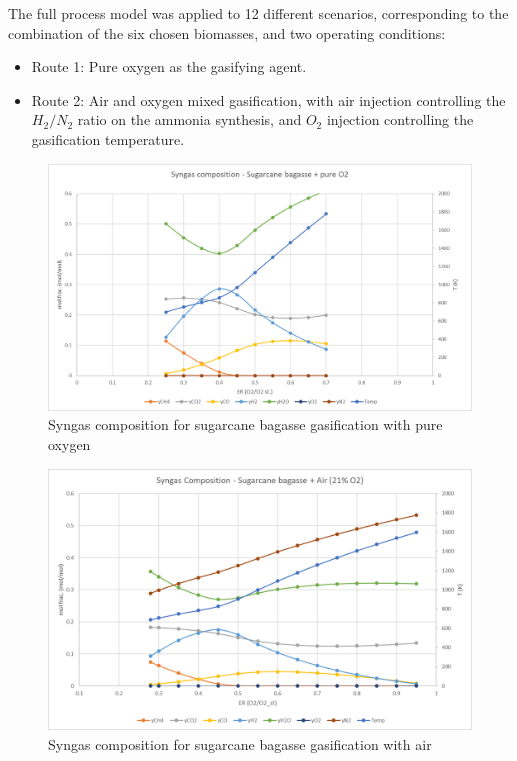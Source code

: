 \documentclass[a4paper, titlepage]{article}
\begin{document}
The full process model was applied to 12 different scenarios, corresponding to the combination of the six chosen 
biomasses, and two operating conditions:

\begin{itemize}
	\item Route 1: Pure oxygen as the gasifying agent.
	\item Route 2: Air and oxygen mixed gasification, with air injection controlling the $H_2/N_2$ ratio on the ammonia
	synthesis, and $O_2$ injection controlling the gasification temperature.
\end{itemize}


\begin{figure}
	\includegraphics[width=\textwidth]{img/fig_syngasbagacoo2.png}
	\caption{Syngas composition for sugarcane bagasse gasification with pure oxygen}
	\label{img_syngascompO2}
\end{figure}

\begin{figure}
	\includegraphics[width=\textwidth]{img/fig_syngasbagacoar.png}
	\caption{Syngas composition for sugarcane bagasse gasification with air}
	\label{img_syngascompair}
\end{figure}
\end{document}

